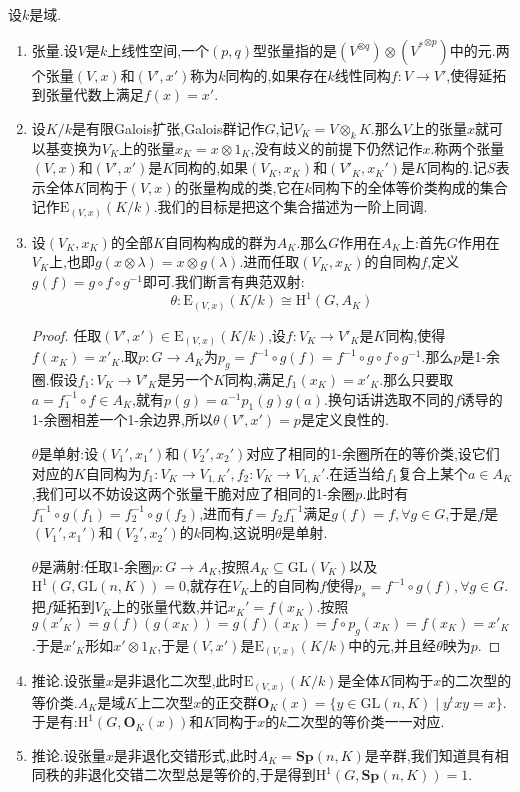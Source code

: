 设$k$是域.
\begin{enumerate}
	\item 张量.设$V$是$k$上线性空间,一个$(p,q)$型张量指的是$\left(V^{\otimes q}\right)\otimes\left({V^*}^{\otimes p}\right)$中的元.两个张量$(V,x)$和$(V',x')$称为$k$同构的,如果存在$k$线性同构$f:V\to V'$,使得延拓到张量代数上满足$f(x)=x'$.
	\item 设$K/k$是有限Galois扩张,Galois群记作$G$,记$V_K=V\otimes_kK$.那么$V$上的张量$x$就可以基变换为$V_K$上的张量$x_K=x\otimes1_K$,没有歧义的前提下仍然记作$x$.称两个张量$(V,x)$和$(V',x')$是$K$同构的,如果$(V_K,x_K)$和$(V'_K,x_K')$是$K$同构的.记$S$表示全体$K$同构于$(V,x)$的张量构成的类,它在$k$同构下的全体等价类构成的集合记作$\mathrm{E}_{(V,x)}(K/k)$.我们的目标是把这个集合描述为一阶上同调.
	\item 设$(V_K,x_K)$的全部$K$自同构构成的群为$A_K$.那么$G$作用在$A_K$上:首先$G$作用在$V_K$上,也即$g(x\otimes\lambda)=x\otimes g(\lambda)$.进而任取$(V_K,x_K)$的自同构$f$,定义$g(f)=g\circ f\circ g^{-1}$即可.我们断言有典范双射:
	$$\theta:\mathrm{E}_{(V,x)}(K/k)\cong\mathrm{H}^1(G,A_K)$$
	\begin{proof}
		
		任取$(V',x')\in\mathrm{E}_{(V,x)}(K/k)$,设$f:V_K\to {V'}_K$是$K$同构,使得$f(x_K)=x'_K$.取$p:G\to A_K$为$p_g=f^{-1}\circ g(f)=f^{-1}\circ g\circ f\circ g^{-1}$.那么$p$是1-余圈.假设$f_1:V_K\to {V'}_K$是另一个$K$同构,满足$f_1(x_K)=x'_K$.那么只要取$a=f_1^{-1}\circ f\in A_K$,就有$p(g)=a^{-1}p_1(g)g(a)$.换句话讲选取不同的$f$诱导的1-余圈相差一个1-余边界,所以$\theta(V',x')=p$是定义良性的.
		
		\qquad
		
		$\theta$是单射:设$(V_1',x_1')$和$(V_2',x_2')$对应了相同的1-余圈所在的等价类,设它们对应的$K$自同构为$f_1:V_K\to V_{1,K}',f_2:V_K\to V_{1,K}'$.在适当给$f_1$复合上某个$a\in A_K$,我们可以不妨设这两个张量干脆对应了相同的1-余圈$p$.此时有$f_1^{-1}\circ g(f_1)=f_2^{-1}\circ g(f_2)$,进而有$f=f_2f_1^{-1}$满足$g(f)=f,\forall g\in G$,于是$f$是$(V_1',x_1')$和$(V_2',x_2')$的$k$同构,这说明$\theta$是单射.
		
		\qquad
		
		$\theta$是满射:任取1-余圈$p:G\to A_K$,按照$A_K\subseteq\mathrm{GL}(V_K)$以及$\mathrm{H}^1(G,\mathrm{GL}(n,K))=0$,就存在$V_K$上的自同构$f$使得$p_s=f^{-1}\circ g(f),\forall g\in G$.把$f$延拓到$V_K$上的张量代数,并记$x_K'=f(x_K)$.按照$g(x'_K)=g(f)(g(x_K))=g(f)(x_K)=f\circ p_g(x_K)=f(x_K)=x'_K$.于是$x'_K$形如$x'\otimes1_K$,于是$(V,x')$是$\mathrm{E}_{(V,x)}(K/k)$中的元,并且经$\theta$映为$p$.
	\end{proof}
    \item 推论.设张量$x$是非退化二次型,此时$\mathrm{E}_{(V,x)}(K/k)$是全体$K$同构于$x$的二次型的等价类.$A_K$是域$K$上二次型$x$的正交群$\textbf{O}_K(x)=\{y\in\mathrm{GL}(n,K)\mid y^txy=x\}$.于是有:$\mathrm{H}^1(G,\textbf{O}_K(x))$和$K$同构于$x$的$k$二次型的等价类一一对应.
    \item 推论.设张量$x$是非退化交错形式,此时$A_K=\textbf{Sp}(n,K)$是辛群,我们知道具有相同秩的非退化交错二次型总是等价的,于是得到$\mathrm{H}^1(G,\textbf{Sp}(n,K))=1$.
\end{enumerate}

